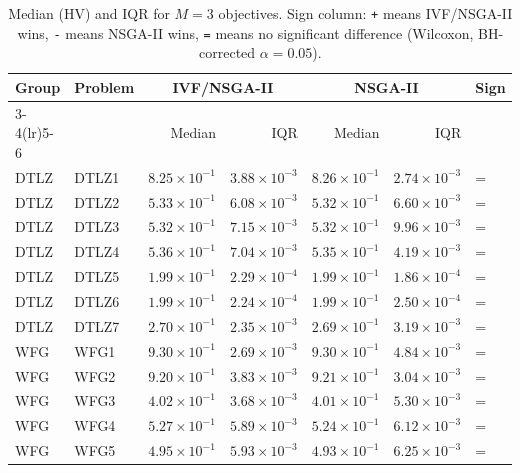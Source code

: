 \begin{table}[t]
\centering
\caption{Median (HV) and IQR for $M=3$ objectives. Sign column: \texttt{+} means IVF/NSGA-II wins, \texttt{-} means NSGA-II wins, \texttt{=} means no significant difference (Wilcoxon, BH-corrected $\alpha=0.05$).}
\label{tab:hv_m3_ivfnsga-ii}
\scriptsize
\begin{tabular}{llrrrrl}
\toprule
Group & Problem & \multicolumn{2}{c}{IVF/NSGA-II} & \multicolumn{2}{c}{NSGA-II} & Sign \\
\cmidrule(lr){3-4}\cmidrule(lr){5-6}
 & & Median & IQR & Median & IQR & \\
\midrule
DTLZ & DTLZ1 & $8.25\!\times\!10^{-1}$ & $3.88\!\times\!10^{-3}$ & $8.26\!\times\!10^{-1}$ & $2.74\!\times\!10^{-3}$ & = \\
DTLZ & DTLZ2 & $5.33\!\times\!10^{-1}$ & $6.08\!\times\!10^{-3}$ & $5.32\!\times\!10^{-1}$ & $6.60\!\times\!10^{-3}$ & = \\
DTLZ & DTLZ3 & $5.32\!\times\!10^{-1}$ & $7.15\!\times\!10^{-3}$ & $5.32\!\times\!10^{-1}$ & $9.96\!\times\!10^{-3}$ & = \\
DTLZ & DTLZ4 & $5.36\!\times\!10^{-1}$ & $7.04\!\times\!10^{-3}$ & $5.35\!\times\!10^{-1}$ & $4.19\!\times\!10^{-3}$ & = \\
DTLZ & DTLZ5 & $1.99\!\times\!10^{-1}$ & $2.29\!\times\!10^{-4}$ & $1.99\!\times\!10^{-1}$ & $1.86\!\times\!10^{-4}$ & = \\
DTLZ & DTLZ6 & $1.99\!\times\!10^{-1}$ & $2.24\!\times\!10^{-4}$ & $1.99\!\times\!10^{-1}$ & $2.50\!\times\!10^{-4}$ & = \\
DTLZ & DTLZ7 & $2.70\!\times\!10^{-1}$ & $2.35\!\times\!10^{-3}$ & $2.69\!\times\!10^{-1}$ & $3.19\!\times\!10^{-3}$ & = \\
\addlinespace
WFG & WFG1 & $9.30\!\times\!10^{-1}$ & $2.69\!\times\!10^{-3}$ & $9.30\!\times\!10^{-1}$ & $4.84\!\times\!10^{-3}$ & = \\
WFG & WFG2 & $9.20\!\times\!10^{-1}$ & $3.83\!\times\!10^{-3}$ & $9.21\!\times\!10^{-1}$ & $3.04\!\times\!10^{-3}$ & = \\
WFG & WFG3 & $4.02\!\times\!10^{-1}$ & $3.68\!\times\!10^{-3}$ & $4.01\!\times\!10^{-1}$ & $5.30\!\times\!10^{-3}$ & = \\
WFG & WFG4 & $5.27\!\times\!10^{-1}$ & $5.89\!\times\!10^{-3}$ & $5.24\!\times\!10^{-1}$ & $6.12\!\times\!10^{-3}$ & = \\
WFG & WFG5 & $4.95\!\times\!10^{-1}$ & $5.93\!\times\!10^{-3}$ & $4.93\!\times\!10^{-1}$ & $6.25\!\times\!10^{-3}$ & = \\

\end{tabular}
\end{table}
